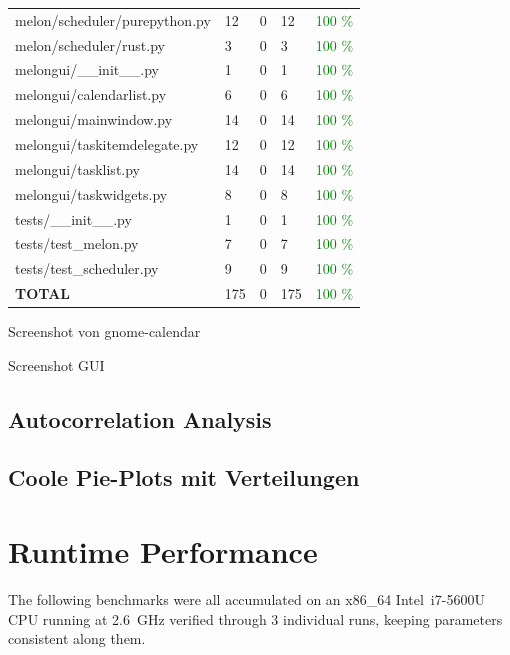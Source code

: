 \documentclass{prettytex/ox/mmsc-special-topic}
\begin{document}
\begin{table}[H]
\begin{tabular}{lllll}
      melon/scheduler/purepython.py   & 12        & 0        & 12        & \textcolor{green}{100 \%} \\
      melon/scheduler/rust.py         & 3         & 0        & 3         & \textcolor{green}{100 \%} \\
      melongui/\_\_init\_\_.py        & 1         & 0        & 1         & \textcolor{green}{100 \%} \\
      melongui/calendarlist.py        & 6         & 0        & 6         & \textcolor{green}{100 \%} \\
      melongui/mainwindow.py          & 14        & 0        & 14        & \textcolor{green}{100 \%} \\
      melongui/taskitemdelegate.py    & 12        & 0        & 12        & \textcolor{green}{100 \%} \\
      melongui/tasklist.py            & 14        & 0        & 14        & \textcolor{green}{100 \%} \\
      melongui/taskwidgets.py         & 8         & 0        & 8         & \textcolor{green}{100 \%} \\
      tests/\_\_init\_\_.py           & 1         & 0        & 1         & \textcolor{green}{100 \%} \\
      tests/test\_melon.py            & 7         & 0        & 7         & \textcolor{green}{100 \%} \\
      tests/test\_scheduler.py        & 9         & 0        & 9         & \textcolor{green}{100 \%} \\
      \hline
      \bf TOTAL                       & 175       & 0        & 175       & \textcolor{green}{100 \%} \\
      \hline
    \end{tabular}
  \end{table}

  Screenshot von gnome-calendar

  Screenshot GUI

  \subsection{Autocorrelation Analysis}
  \subsection{Coole Pie-Plots mit Verteilungen}

  \section{Runtime Performance}
  \label{sec:runtime}
  The following benchmarks were all accumulated on an x86\_64 Intel\textregistered \, i7-5600U CPU running at \SI{2.6}{\giga\hertz} verified through 3 individual runs, keeping parameters consistent along them.
\end{document}
